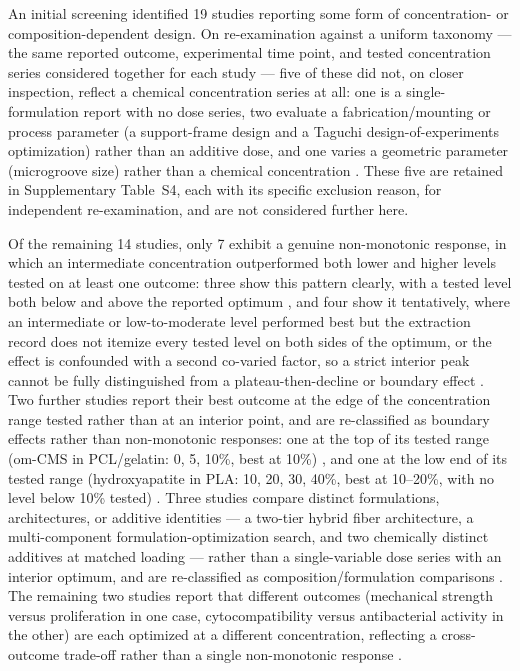 \documentclass[5p,times,twocolumn]{elsarticle}
\begin{document}
An initial screening identified 19 studies reporting some form of concentration- or composition-dependent design. On re-examination against a uniform taxonomy --- the same reported outcome, experimental time point, and tested concentration series considered together for each study --- five of these did not, on closer inspection, reflect a chemical concentration series at all: one is a single-formulation report with no dose series, two evaluate a fabrication/mounting or process parameter (a support-frame design and a Taguchi design-of-experiments optimization) rather than an additive dose, and one varies a geometric parameter (microgroove size) rather than a chemical concentration \cite{ref15,ref34,ref39,ref44,ref63}. These five are retained in Supplementary Table~S4, each with its specific exclusion reason, for independent re-examination, and are not considered further here.

Of the remaining 14 studies, only 7 exhibit a genuine non-monotonic response, in which an intermediate concentration outperformed both lower and higher levels tested on at least one outcome: three show this pattern clearly, with a tested level both below and above the reported optimum \cite{ref43,ref50,ref67}, and four show it tentatively, where an intermediate or low-to-moderate level performed best but the extraction record does not itemize every tested level on both sides of the optimum, or the effect is confounded with a second co-varied factor, so a strict interior peak cannot be fully distinguished from a plateau-then-decline or boundary effect \cite{ref19,ref37,ref42,ref59}. Two further studies report their best outcome at the edge of the concentration range tested rather than at an interior point, and are re-classified as boundary effects rather than non-monotonic responses: one at the top of its tested range (om-CMS in PCL/gelatin: 0, 5, 10\%, best at 10\%) \cite{ref30}, and one at the low end of its tested range (hydroxyapatite in PLA: 10, 20, 30, 40\%, best at 10--20\%, with no level below 10\% tested) \cite{ref36}. Three studies compare distinct formulations, architectures, or additive identities --- a two-tier hybrid fiber architecture, a multi-component formulation-optimization search, and two chemically distinct additives at matched loading --- rather than a single-variable dose series with an interior optimum, and are re-classified as composition/formulation comparisons \cite{ref28,ref62,ref65}. The remaining two studies report that different outcomes (mechanical strength versus proliferation in one case, cytocompatibility versus antibacterial activity in the other) are each optimized at a different concentration, reflecting a cross-outcome trade-off rather than a single non-monotonic response \cite{ref57,ref61}.
\end{document}
